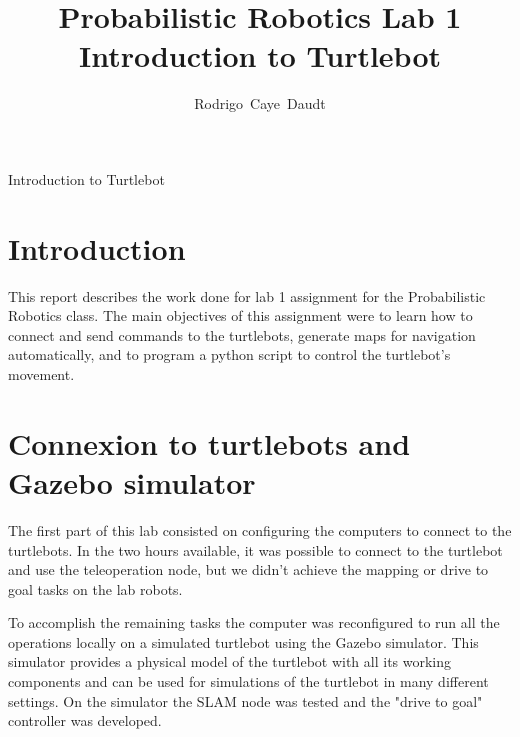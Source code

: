 \documentclass[11pt,oneside,a4paper]{article}
\begin{document}
\title{Probabilistic Robotics Lab 1 \\ Introduction to Turtlebot}
%
%
\author{Rodrigo~Caye~Daudt}


%
{Introduction to Turtlebot}


\maketitle







\section{Introduction}

This report describes the work done for lab 1 assignment for the Probabilistic Robotics class. The main objectives of this assignment were to learn how to connect and send commands to the turtlebots, generate maps for navigation automatically, and to program a python script to control the turtlebot's movement.

\section{Connexion to turtlebots and Gazebo simulator}

The first part of this lab consisted on configuring the computers to connect to the turtlebots. In the two hours available, it was possible to connect to the turtlebot and use the teleoperation node, but we didn't achieve the mapping or drive to goal tasks on the lab robots.

To accomplish the remaining tasks the computer was reconfigured to run all the operations locally on a simulated turtlebot using the Gazebo simulator. This simulator provides a physical model of the turtlebot with all its working components and can be used for simulations of the turtlebot in many different settings. On the simulator the SLAM node was tested and the "drive to goal" controller was developed.
\end{document}
